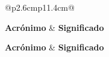 
{\renewcommand{\arraystretch}{1.45}
\begin{longtable}{@{\hspace{4pt}}p{2.6cm}p{11.4cm}@{\hspace{4pt}}}

\toprule
\textbf{Acrónimo} & \textbf{Significado} \\
\midrule
\endfirsthead

\toprule
\textbf{Acrónimo} & \textbf{Significado} \\
\midrule
\endhead

\midrule
{} \\
\endfoot

\bottomrule
\endlastfoot


\end{longtable}}

